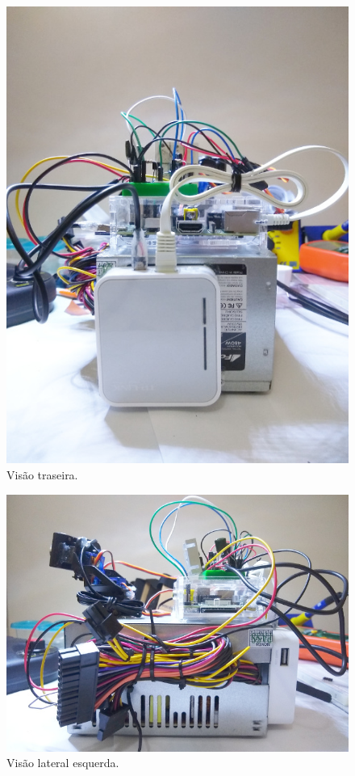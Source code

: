 \begin{apendicesenv}
\begin{figure}[H]
	\centering
	\includegraphics[width=1\linewidth]{figuras/vista_traseira}
	\caption{Visão traseira.}
	\label{fig:vistatraseira}
\end{figure}

\begin{figure}[H]
	\centering
	\includegraphics[width=1\linewidth]{figuras/vista_esquerda}
	\caption{Visão lateral esquerda.}
	\label{fig:vistaesquerda}
\end{figure}


\end{apendicesenv}
